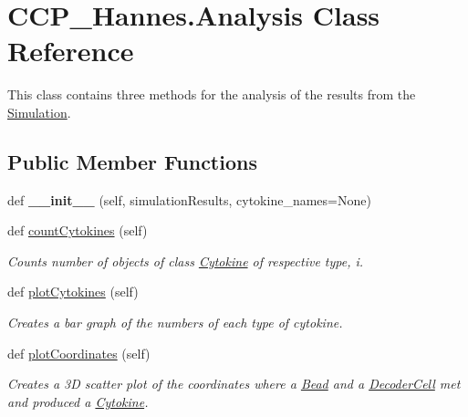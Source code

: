\hypertarget{class_c_c_p___hannes_1_1_analysis}{}\section{C\+C\+P\+\_\+\+Hannes.\+Analysis Class Reference}
\label{class_c_c_p___hannes_1_1_analysis}


This class contains three methods for the analysis of the results from the \mbox{\hyperlink{class_c_c_p___hannes_1_1_simulation}{Simulation}}.  


\subsection*{Public Member Functions}
\begin{DoxyCompactItemize}
\item 
\mbox{\label{class_c_c_p___hannes_1_1_analysis_a05c37e0523e8c7de03b8b808d1db1ae0}} 
def {\bfseries \+\_\+\+\_\+init\+\_\+\+\_\+} (self, simulation\+Results, cytokine\+\_\+names=None)
\item 
def \mbox{\hyperlink{class_c_c_p___hannes_1_1_analysis_a914957b746c4d5d7b13daa2786cc4ae6}{count\+Cytokines}} (self)
\begin{DoxyCompactList}\small\item\em Counts number of objects of class \mbox{\hyperlink{class_c_c_p___hannes_1_1_cytokine}{Cytokine}} of respective type, i. \end{DoxyCompactList}\item 
def \mbox{\hyperlink{class_c_c_p___hannes_1_1_analysis_aa008afd3924050a0634ffdde72b3e9d9}{plot\+Cytokines}} (self)
\begin{DoxyCompactList}\small\item\em Creates a bar graph of the numbers of each type of cytokine. \end{DoxyCompactList}\item 
def \mbox{\hyperlink{class_c_c_p___hannes_1_1_analysis_a4802fb98580b33a45025d96b64f21358}{plot\+Coordinates}} (self)
\begin{DoxyCompactList}\small\item\em Creates a 3D scatter plot of the coordinates where a \mbox{\hyperlink{class_c_c_p___hannes_1_1_bead}{Bead}} and a \mbox{\hyperlink{class_c_c_p___hannes_1_1_decoder_cell}{Decoder\+Cell}} met and produced a \mbox{\hyperlink{class_c_c_p___hannes_1_1_cytokine}{Cytokine}}. \end{DoxyCompactList}\end{DoxyCompactItemize}
